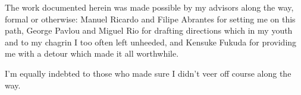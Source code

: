 \begin{acknowledgements}

The work documented herein was made possible by my advisors along the way, formal or otherwise: Manuel Ricardo and Filipe Abrantes for setting me on this path, George Pavlou and Miguel Rio for drafting directions which in my youth and to my chagrin I too often left unheeded, and Kensuke Fukuda for providing me with a detour which made it all worthwhile.

I'm equally indebted to those who made sure I didn't veer off course along the way.

\end{acknowledgements}

